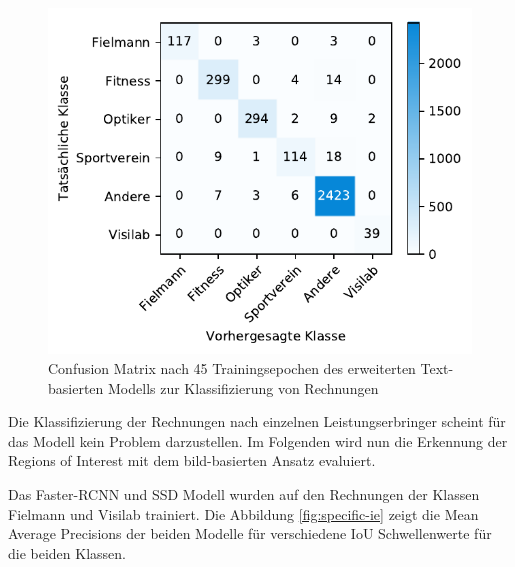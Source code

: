 \begin{figure}[h!] 
    \captionsetup{width=.9\linewidth}
    \caption{Confusion Matrix nach 45 Trainingsepochen des erweiterten Text-basierten Modells zur Klassifizierung von Rechnungen}
    \label{fielmann-cm}
    \centering
    \includegraphics[scale=1]{graphics/matplot/class__fielmann__cm_44.pdf}
\end{figure}

Die Klassifizierung der Rechnungen nach einzelnen Leistungserbringer scheint für das Modell kein Problem darzustellen. Im Folgenden wird nun die Erkennung der Regions of Interest mit dem bild-basierten Ansatz evaluiert.

Das Faster-RCNN und SSD Modell wurden auf den Rechnungen der Klassen Fielmann und Visilab trainiert. Die Abbildung \ref{fig:specific-ie} zeigt die Mean Average Precisions der beiden Modelle für verschiedene IoU Schwellenwerte für die beiden Klassen.

